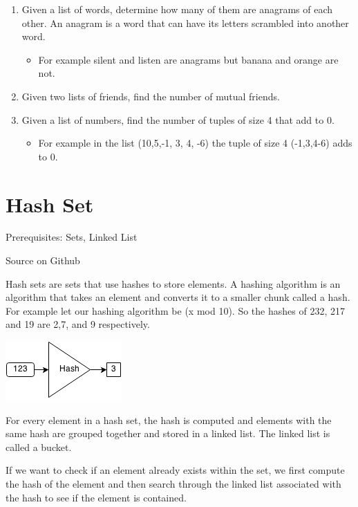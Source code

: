 \documentclass[11pt,oneside]{book}
\makeatletter
\def\maxwidth#1{\ifdim\Gin@nat@width>#1 #1\else\Gin@nat@width\fi}
\makeatother
\begin{document}
\begin{enumerate}
\item Given a list of words, determine how many of them are anagrams of each other. An anagram is a word that can have its letters scrambled into another word. 

\begin{itemize}
\item For example silent and listen are anagrams but banana and orange are not.
\end{itemize}
\item Given two lists of friends, find the number of mutual friends.
\item Given a list of numbers, find the number of tuples of size 4 that add to 0. 

\begin{itemize}
\item For example in the list (10,5,-1, 3, 4, -6) the tuple of size 4 (-1,3,4-6) adds to 0.
\end{itemize}
\end{enumerate}

        \section{ Hash Set }
        

Prerequisites: Sets, Linked List

Source on Github

Hash sets are sets that use hashes to store elements. A hashing algorithm is an algorithm that takes an element and converts it to a smaller chunk called a hash. For example let our hashing algorithm be (x mod 10). So the hashes of 232, 217 and 19 are 2,7, and 9 respectively.

\includegraphics[width=\maxwidth{\textwidth}]{hashcode.png}

For every element in a hash set, the hash is computed and elements with the same hash are grouped together and stored in a linked list. The linked list is called a bucket.

If we want to check if an element already exists within the set, we first compute the hash of the element and then search through the linked list associated with the hash to see if the element is contained.
\end{document}
